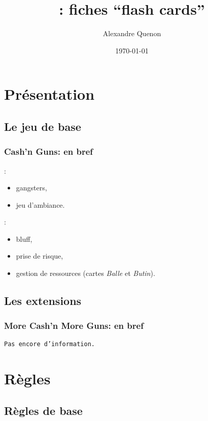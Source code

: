 \documentclass[11pt]{beamer}
\title[\thegame{} : fiches]{\thegame{}: fiches \enquote{flash cards}}
\author[A. Quenon]{Alexandre Quenon}
\date{\today}
\newcommand{\thegame}{Cash'n Guns}
\begin{document}
\frame{\titlepage}


\begin{frame}
	\tableofcontents
\end{frame}



\section{Présentation}


\subsection{Le jeu de base}

	\begin{frame}
		\frametitle{\thegame{}: en bref}
		
		:
		\begin{itemize}
			\item gangsters,
			\item jeu d'ambiance.
		\end{itemize}
	
		\vspace*{1ex}
		
		:
		\begin{itemize}
			\item bluff,
			\item prise de risque,
			\item gestion de ressources (cartes \emph{Balle} et \emph{Butin}).
		\end{itemize}
	\end{frame}


\subsection{Les extensions}

	\begin{frame}
		\frametitle{More Cash'n More Guns: en bref}
		
		\texttt{Pas encore d'information.}
	\end{frame}



\section{Règles}


\subsection{Règles de base}
\end{document}
